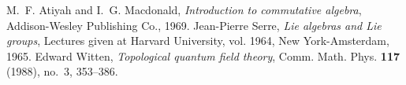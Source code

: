 \providecommand{\bysame}{\leavevmode\hbox to3em{\hrulefill}\thinspace}
\providecommand{\href}[2]{#2}
\begin{thebibliography}{1}

M.~F. Atiyah and I.~G. Macdonald, \emph{{I}ntroduction to commutative algebra},
  Addison-Wesley Publishing Co., 1969.
Jean-Pierre Serre, \emph{{L}ie algebras and {L}ie groups}, Lectures given at
  Harvard University, vol. 1964, New York-Amsterdam,
  1965.
Edward Witten, \emph{{T}opological quantum field theory}, Comm. Math. Phys.
  \textbf{117} (1988), no.~3, 353--386.

\end{thebibliography}

